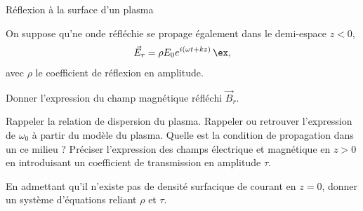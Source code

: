 \begin{exo}[PSI][1][TD]{Réflexion à la surface d'un plasma}
\begin{quest}
    \item On suppose qu'ne onde réfléchie se propage également dans le demi-espace $z<0$,
    \begin{equation}
   \Vec{E}_{r} = \rho E_{0} e^{i(\omega t + k z)} \,\ex,
    \end{equation}
    avec $\rho$ le coefficient de réflexion en amplitude.
  
    Donner l'expression du champ magnétique réfléchi $\Vec{B}_{r}$.
  
  
    \item Rappeler la relation de dispersion du plasma. Rappeler ou retrouver l'expression de $\omega_0$ à partir du modèle du plasma. Quelle est la condition de propagation dans un ce milieu ? Préciser l'expression des champs électrique et magnétique en $z>0$ en introduisant
    un coefficient de transmission en amplitude $\tau$.
  
  
    \item En admettant qu'il n'existe pas de densité surfacique de courant en $z=0$, donner un système d'équations reliant $\rho$ et $\tau$.
  

\end{quest}
\end{exo}

